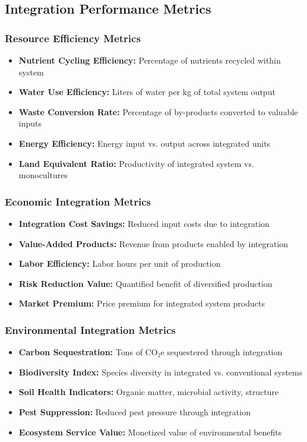 \subsection{Integration Performance Metrics}

\subsubsection{Resource Efficiency Metrics}
\begin{itemize}
    \item \textbf{Nutrient Cycling Efficiency:} Percentage of nutrients recycled within system
    \item \textbf{Water Use Efficiency:} Liters of water per kg of total system output
    \item \textbf{Waste Conversion Rate:} Percentage of by-products converted to valuable inputs
    \item \textbf{Energy Efficiency:} Energy input vs. output across integrated units
    \item \textbf{Land Equivalent Ratio:} Productivity of integrated system vs. monocultures
\end{itemize}

\subsubsection{Economic Integration Metrics}
\begin{itemize}
    \item \textbf{Integration Cost Savings:} Reduced input costs due to integration
    \item \textbf{Value-Added Products:} Revenue from products enabled by integration
    \item \textbf{Labor Efficiency:} Labor hours per unit of production
    \item \textbf{Risk Reduction Value:} Quantified benefit of diversified production
    \item \textbf{Market Premium:} Price premium for integrated system products
\end{itemize}

\subsubsection{Environmental Integration Metrics}
\begin{itemize}
    \item \textbf{Carbon Sequestration:} Tons of CO₂e sequestered through integration
    \item \textbf{Biodiversity Index:} Species diversity in integrated vs. conventional systems
    \item \textbf{Soil Health Indicators:} Organic matter, microbial activity, structure
    \item \textbf{Pest Suppression:} Reduced pest pressure through integration
    \item \textbf{Ecosystem Service Value:} Monetized value of environmental benefits
\end{itemize}

